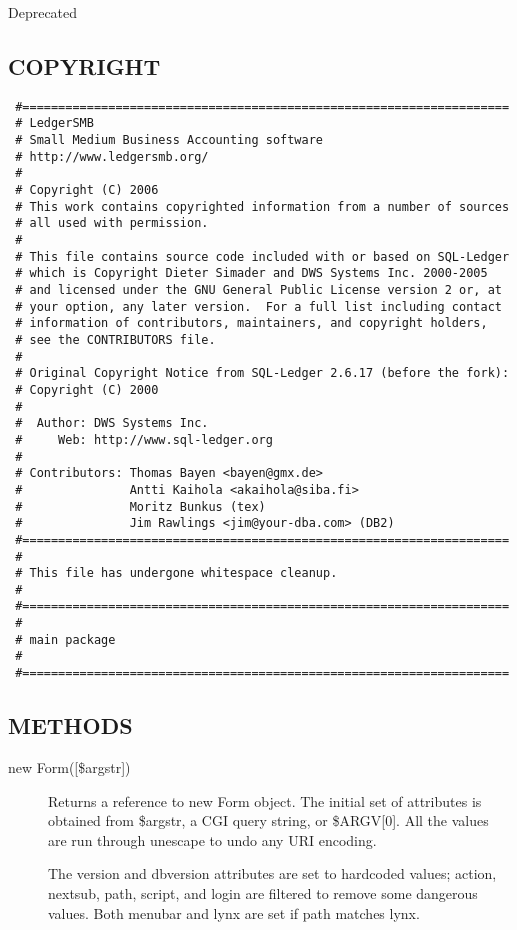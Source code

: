 \begin{description}
\begin{description}
\begin{description}
\begin{description}
\begin{description}
Deprecated

\subsection*{COPYRIGHT\label{LedgerSMB::Form_COPYRIGHT}}
\begin{verbatim}
 #====================================================================
 # LedgerSMB
 # Small Medium Business Accounting software
 # http://www.ledgersmb.org/
 #
 # Copyright (C) 2006
 # This work contains copyrighted information from a number of sources
 # all used with permission.
 #
 # This file contains source code included with or based on SQL-Ledger
 # which is Copyright Dieter Simader and DWS Systems Inc. 2000-2005
 # and licensed under the GNU General Public License version 2 or, at
 # your option, any later version.  For a full list including contact
 # information of contributors, maintainers, and copyright holders,
 # see the CONTRIBUTORS file.
 #
 # Original Copyright Notice from SQL-Ledger 2.6.17 (before the fork):
 # Copyright (C) 2000
 #
 #  Author: DWS Systems Inc.
 #     Web: http://www.sql-ledger.org
 #
 # Contributors: Thomas Bayen <bayen@gmx.de>
 #               Antti Kaihola <akaihola@siba.fi>
 #               Moritz Bunkus (tex)
 #               Jim Rawlings <jim@your-dba.com> (DB2)
 #====================================================================
 #
 # This file has undergone whitespace cleanup.
 #
 #====================================================================
 #
 # main package
 #
 #====================================================================
\end{verbatim}
\subsection*{METHODS\label{LedgerSMB::Form_METHODS}}
\begin{description}

\item[{new Form([\$argstr])}] \mbox{}

Returns a reference to new Form object.  The initial set of attributes is
obtained from \$argstr, a CGI query string, or \$ARGV[0].  All the values are
run through unescape to undo any URI encoding.



The version and dbversion attributes are set to hardcoded values; action,
nextsub, path, script, and login are filtered to remove some dangerous values.
Both menubar and lynx are set if path matches lynx.




\end{description}
\end{description}
\end{description}
\end{description}
\end{description}
\end{description}
